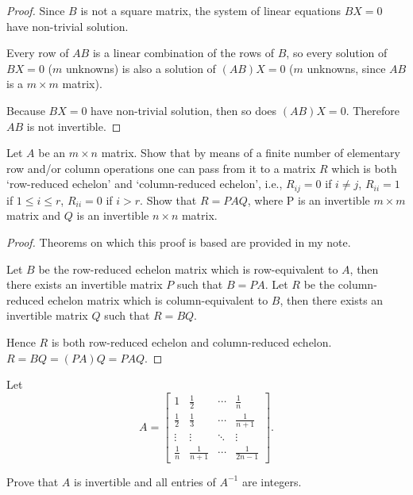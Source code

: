 \begin{proof}
    Since $B$ is not a square matrix, the system of linear equations $BX = 0$ have non-trivial solution.

    Every row of $AB$ is a linear combination of the rows of $B$, so every solution of $BX = 0$ ($m$ unknowns) is also a solution of $(AB)X = 0$ ($m$ unknowns, since $AB$ is a $m\times m$ matrix).

    Because $BX = 0$ have non-trivial solution, then so does $(AB)X = 0$. Therefore $AB$ is not invertible.
\end{proof}

\begin{exercise}
    Let $A$ be an $m\times n$ matrix. Show that by means of a finite number of elementary row and/or column operations one can pass from it to a matrix $R$ which is both `row-reduced echelon' and `column-reduced echelon', i.e., $R_{ij} = 0$ if $i \ne j$, $R_{ii} = 1$ if $1\le i\le r$, $R_{ii} = 0$ if $i > r$. Show that $R = PAQ$, where P is an invertible $m\times m$ matrix and $Q$ is an invertible $n\times n$ matrix.
\end{exercise}

\begin{proof}
    Theorems on which this proof is based are provided in my note.

    Let $B$ be the row-reduced echelon matrix which is row-equivalent to $A$, then there exists an invertible matrix $P$ such that $B = PA$. Let $R$ be the column-reduced echelon matrix which is column-equivalent to $B$, then there exists an invertible matrix $Q$ such that $R = BQ$.

    Hence $R$ is both row-reduced echelon and column-reduced echelon. $R = BQ = (PA)Q = PAQ$.
\end{proof}

\begin{exercise}
    Let
    \[
        A = \begin{bmatrix}
            1           & \frac{1}{2}   & \cdots & \frac{1}{n}    \\
            \frac{1}{2} & \frac{1}{3}   & \cdots & \frac{1}{n+1}  \\
            \vdots      & \vdots        & \ddots & \vdots         \\
            \frac{1}{n} & \frac{1}{n+1} & \cdots & \frac{1}{2n-1}
        \end{bmatrix}.
    \]

    Prove that $A$ is invertible and all entries of $A^{-1}$ are integers.
\end{exercise}

